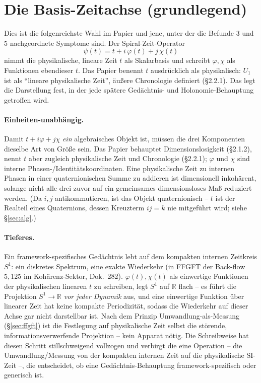 \section{Die Basis-Zeitachse (grundlegend)}
Dies ist die folgenreichste Wahl im Papier und jene, unter der die Befunde 3 und 5
nachgeordnete Symptome sind. Der Spiral-Zeit-Operator
\begin{equation}
\psi(t) = t + i\,\varphi(t) + j\,\chi(t)
\end{equation}
nimmt die physikalische, lineare Zeit $t$ als Skalarbasis und schreibt $\varphi,\chi$ als
Funktionen ebendieser $t$. Das Papier benennt $t$ ausdrücklich als physikalisch: $U_1$
ist als ``lineare physikalische Zeit'', äußere Chronologie definiert (\S2.2.1). Das legt
die Darstellung fest, in der jede spätere Gedächtnis- und Holonomie-Behauptung getroffen
wird.

\paragraph{Einheiten-unabhängig.} Damit $t + i\varphi + j\chi$ \emph{ein} algebraisches
Objekt ist, müssen die drei Komponenten dieselbe Art von Größe sein. Das Papier behauptet
Dimensionslosigkeit (\S2.1.2), nennt $t$ aber zugleich physikalische Zeit und Chronologie
(\S2.2.1); $\varphi$ und $\chi$ sind interne Phasen-/Identitätskoordinaten. Eine
physikalische Zeit zu internen Phasen in einer quaternionischen Summe zu addieren ist
dimensionell inkohärent, solange nicht alle drei zuvor auf ein gemeinsames dimensionsloses
Maß reduziert werden. (Da $i,j$ antikommutieren, ist das Objekt quaternionisch -- $t$ ist
der Realteil eines Quaternions, dessen Kreuzterm $ij=k$ nie mitgeführt wird; siehe
\S\ref{sec:alg}.)

\paragraph{Tieferes.} Ein framework-spezifisches Gedächtnis lebt auf dem kompakten
internen Zeitkreis $S^1$: ein diskretes Spektrum, eine exakte Wiederkehr (in FFGFT der
Back-flow $5{,}125$ im Kohärenz-Sektor, Dok.~282). $\varphi(t),\chi(t)$ als einwertige
Funktionen der physikalischen linearen $t$ zu schreiben, legt $S^1$ auf $\mathbb{R}$ flach
-- es führt die Projektion $S^1\!\to\!\mathbb{R}$ \emph{vor jeder Dynamik} aus, und eine
einwertige Funktion über linearer Zeit hat keine kompakte Periodizität, sodass die
Wiederkehr auf dieser Achse gar nicht darstellbar ist. Nach dem Prinzip
Umwandlung-als-Messung (\S\ref{sec:ffgft}) ist die Festlegung auf physikalische Zeit selbst
die störende, informationsverwerfende Projektion -- kein Apparat nötig. Die Schreibweise
hat diesen Schritt stillschweigend vollzogen und verbirgt die eine Operation -- die
Umwandlung/Messung von der kompakten internen Zeit auf die physikalische SI-Zeit --, die
entscheidet, ob eine Gedächtnis-Behauptung framework-spezifisch oder generisch ist.

